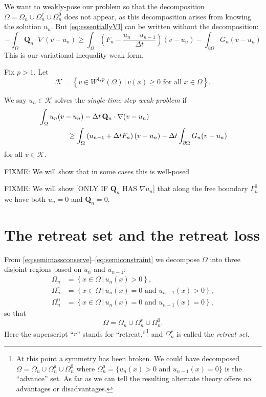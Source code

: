 \documentclass[final,leqno,onefignum,onetabnum]{siamltex1213bueler}
\newcommand\bQ{\mathbf{Q}}
\renewcommand{\grad}{\nabla}
\begin{document}
We want to weakly-pose our problem so that the decomposition $\Omega = \Omega_n \cup \Omega_n^r \cup \Omega_n^0$ does not appear, as this decomposition arises from knowing the solution $u_n$.  But \eqref{eq:essentiallyVI} can be written without the decomposition:
\begin{equation}
-\int_{\Omega} \bQ_n \cdot \grad(v-u_n) \ge \int_{\Omega} \left(F_n - \frac{u_n - u_{n-1}}{\Delta t}\right) (v-u_n) - \int_{\partial \Omega} G_n (v-u_n) \label{eq:morallytheVI}
\end{equation}
This is our variational inequality weak form.

\medskip
\begin{definition}  Fix $p>1$.  Let
    $$\mathcal{K} = \left\{v \in W^{1,p}(\Omega) \,\big|\, v(x) \ge 0 \text{ for all } x \in \Omega\right\}.$$
\end{definition}

\begin{definition}  We say $u_n \in \mathcal{K}$ solves the \emph{single-time-step weak problem} if 
\begin{align}
&\int_{\Omega} u_n (v-u_n) - \Delta t\, \bQ_n \cdot \grad(v-u_n)  \label{eq:theVI} \\
  &\qquad\qquad \ge \int_{\Omega} \left(u_{n-1} + \Delta t F_n\right) (v-u_n) - \Delta t \int_{\partial \Omega} G_n (v-u_n)\notag
\end{align}
for all $v \in \mathcal{K}$.
\end{definition}

FIXME:  We will show that in some cases this is well-posed

FIXME:  We will show [ONLY IF $\bQ_n$ HAS $\grad u_n$] that along the free boundary $\Gamma_n^0$ we have both $u_n=0$ and $\bQ_n = 0$.


\section{The retreat set and the retreat loss}  \label{sec:retreatdefn}

From \eqref{eq:semimassconserve}--\eqref{eq:semiconstraint} we decompose $\Omega$ into three disjoint regions based on $u_n$ and $u_{n-1}$:
\begin{align*}
\Omega_n &= \left\{x \in \Omega \,\big|\, u_n(x)>0\right\}, \\
\Omega_n^r &= \left\{x \in \Omega \,\big|\, u_n(x)=0 \text{ and } u_{n-1}(x) > 0\right\}, \\
\Omega_n^0 &= \left\{x \in \Omega \,\big|\, u_n(x)=0 \text{ and } u_{n-1}(x) = 0\right\},
\end{align*}
so that
\begin{equation}
\Omega = \Omega_n \cup \Omega_n^r \cup \Omega_n^0.  \label{eq:omegadecomposition}
\end{equation}
Here the superscript ``$r$'' stands for ``retreat,''\footnote{At this point a symmetry has been broken.  We could have decomposed $\Omega= \Omega_n \cup \Omega_n^a \cup \Omega_n^0$ where $\Omega_n^a = \{u_n(x) > 0 \text{ and } u_{n-1}(x) = 0\}$ is the ``advance'' set.  As far as we can tell the resulting alternate theory offers no advantages or disadvantages.} and $\Omega_n^r$ is called the \emph{retreat set}.
\end{document}
